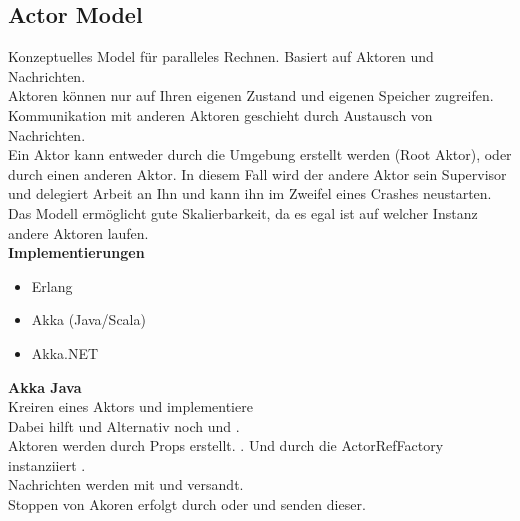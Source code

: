 \subsection{Actor Model}
Konzeptuelles Model für paralleles Rechnen. Basiert auf Aktoren und Nachrichten.\\
Aktoren können nur auf Ihren eigenen Zustand und eigenen Speicher zugreifen. Kommunikation mit anderen Aktoren geschieht
durch Austausch von Nachrichten. \\
Ein Aktor kann entweder durch die Umgebung erstellt werden (Root Aktor),
oder durch einen anderen Aktor. In diesem Fall wird der andere Aktor sein Supervisor und delegiert Arbeit an Ihn und
kann ihn im Zweifel eines Crashes neustarten.\\
Das Modell ermöglicht gute Skalierbarkeit, da es egal ist auf welcher Instanz andere Aktoren laufen.\\
\textbf{Implementierungen}
\begin{itemize}
  \item Erlang
  \item Akka (Java/Scala)
  \item Akka.NET
\end{itemize}
\textbf{Akka Java}\\
Kreiren eines Aktors  und implementiere \\
Dabei hilft  und 
Alternativ noch  und .\\
Aktoren werden durch Props erstellt. .
Und durch die ActorRefFactory instanziiert .\\
Nachrichten werden mit  und 
versandt.\\
Stoppen von Akoren erfolgt durch  oder  und senden dieser.